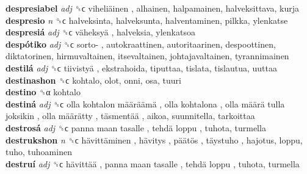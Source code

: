 \textbf{despresiabel} \emph{adj}  ␝ϲ   viheliäinen , alhainen, halpamainen, halveksittava, kurja  \\
\textbf{despresio} \emph{n}  ␝ϲ  halveksinta, halveksunta, halventaminen, pilkka, ylenkatse  \\
\textbf{despresiá} \emph{adj}  ␝ϲ   väheksyä , halveksia, ylenkatsoa  \\
\textbf{despótiko} \emph{adj}  ␝ϲ   sorto- , autokraattinen, autoritaarinen, despoottinen, diktatorinen, hirmuvaltainen, itsevaltainen, johtajavaltainen, tyrannimainen  \\
\textbf{destilá} \emph{adj}  ␝ϲ   tiivistyä , ekstrahoida, tiputtaa, tislata, tislautua, uuttaa  \\
\textbf{destinashon} ␝ϲ  kohtalo, olot, onni, osa, tuuri  \\
\textbf{destino} ␝α  kohtalo  \\
\textbf{destiná} \emph{adj}  ␝ϲ   olla kohtalon määräämä ,  olla kohtalona ,  olla määrä tulla joksikin ,  olla määrätty ,  täsmentää , aikoa, suunnitella, tarkoittaa  \\
\textbf{destrosá} \emph{adj}  ␝ϲ   panna maan tasalle ,  tehdä loppu , tuhota, turmella  \\
\textbf{destrukshon} \emph{n}  ␝ϲ   hävittäminen ,  hävitys ,  päätös ,  täystuho , hajotus, loppu, tuho, tuhoaminen  \\
\textbf{destruí} \emph{adj}  ␝ϲ   hävittää ,  panna maan tasalle ,  tehdä loppu , tuhota, turmella  \\
